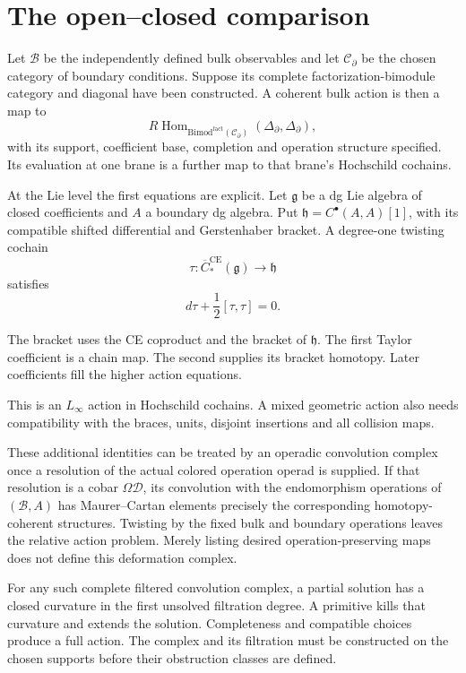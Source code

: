 \section{The open--closed comparison}

Let $\mathcal B$ be the independently
defined bulk observables and let
$\mathcal C_\partial$ be the chosen
category of boundary conditions. Suppose
its complete factorization-bimodule
category and diagonal have been
constructed. A coherent bulk action is
then a map to
\[
 R\operatorname{Hom}_{\mathrm{Bimod}^{\mathrm{fact}}
                          (\mathcal C_\partial)}
            (\Delta_\partial,\Delta_\partial),
\]
with its support, coefficient base,
completion and operation structure
specified. Its evaluation at one brane
is a further map to that brane's
Hochschild cochains.

At the Lie level the first equations
are explicit. Let $\mathfrak g$ be a dg Lie algebra of closed coefficients
and $A$ a boundary dg algebra. Put
$\mathfrak h=C^\bullet(A,A)[1]$, with its compatible
shifted differential and Gerstenhaber bracket. A degree-one
twisting cochain
\[
 \tau:\overline C_*^{\mathrm{CE}}(\mathfrak g)
                                      \longrightarrow\mathfrak h
\]
satisfies
\begin{equation}\label{mht:eq:centre-action-mc}
 d\tau+\frac12[\tau,\tau]=0.
\end{equation}

The bracket uses the CE coproduct and
the bracket of $\mathfrak h$. The first
Taylor coefficient is a chain map. The second supplies its bracket
homotopy. Later coefficients fill the
higher action equations. 

This is an
$L_\infty$ action in Hochschild
cochains. A mixed geometric action also
needs compatibility with the braces,
units, disjoint insertions and all
collision maps.

These additional identities can be
treated by an operadic convolution
complex once a resolution of the actual
colored operation operad is supplied.
If that resolution is a cobar
$\Omega\mathcal D$, its convolution
with the endomorphism operations of
$(\mathcal B,A)$ has Maurer--Cartan
elements precisely the corresponding
homotopy-coherent structures. Twisting
by the fixed bulk and boundary
operations leaves the relative action
problem. Merely listing desired
operation-preserving maps does not
define this deformation complex.

For any such complete filtered
convolution complex, a partial solution
has a closed curvature in the first
unsolved filtration degree. A primitive
kills that curvature and extends the
solution. Completeness and compatible
choices produce a full action. The
complex and its filtration must be
constructed on the chosen supports
before their obstruction classes are
defined.

